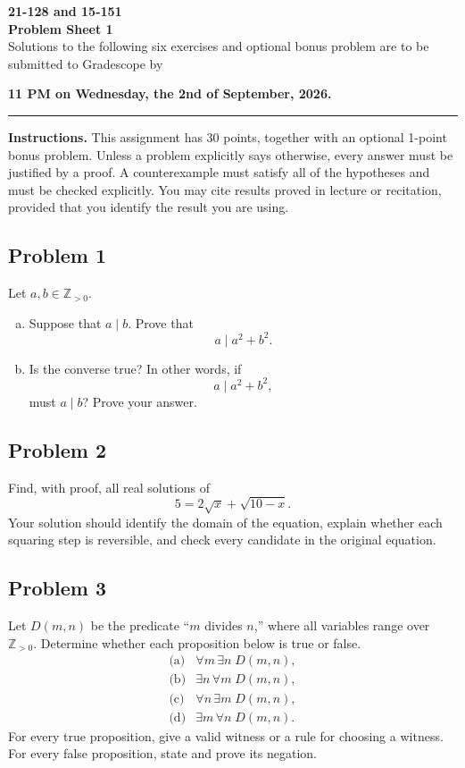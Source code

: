\documentclass[11pt]{article}
\newcommand{\Z}{\mathbb{Z}}
\newcommand{\problem}[2]{\subsection*{Problem #1 \hfill \normalfont[#2 points]}}
\begin{document}
\pagestyle{empty}

\begin{center}
    {\Large\bfseries 21-128 and 15-151}\\[3pt]
    {\LARGE\bfseries Problem Sheet 1}\\[7pt]

Solutions to the following six exercises and optional bonus problem are to be 
submitted to Gradescope by

\textbf{11 PM on Wednesday, the 2nd of September, 2026.}
\end{center}

\hrule
\vspace{0.6em}

\textbf{Instructions.}
This assignment has 30 points, together with an optional 1-point bonus problem.
Unless a problem explicitly says otherwise, every answer must be justified by a proof.
A counterexample must satisfy all of the hypotheses and must be checked explicitly.
You may cite results proved in lecture or recitation, provided that you identify the 
result you are using.


\problem{1}{4}
Let $a,b\in\Z_{>0}$.
\begin{enumerate}[(a)]
    \item Suppose that $a\mid b$. Prove that
    \[
        a\mid a^2+b^2.
    \]

    \item Is the converse true? In other words, if
    \[
        a\mid a^2+b^2,
    \]
    must $a\mid b$? Prove your answer.
\end{enumerate}


\problem{2}{4}
Find, with proof, all real solutions of
\[
    5=2\sqrt{x}+\sqrt{10-x}.
\]
Your solution should identify the domain of the equation, explain whether each squaring step is reversible, and check every candidate in the original equation.


\problem{3}{5}
Let $D(m,n)$ be the predicate ``$m$ divides $n$,'' where all variables range over $\Z_{>0}$.
Determine whether each proposition below is true or false.
\[
\begin{array}{ll}
\text{(a)} & \forall m\,\exists n\; D(m,n),\\[2pt]
\text{(b)} & \exists n\,\forall m\; D(m,n),\\[2pt]
\text{(c)} & \forall n\,\exists m\; D(m,n),\\[2pt]
\text{(d)} & \exists m\,\forall n\; D(m,n).
\end{array}
\]
For every true proposition, give a valid witness or a rule for choosing a witness.
For every false proposition, state and prove its negation.
\end{document}
